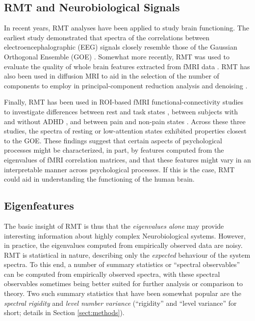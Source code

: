 \documentclass[12pt]{spieman}  %
\begin{document}
\begin{spacing}{2}
\subsection{RMT and Neurobiological Signals}

In recent years, RMT analyses have been applied to study brain functioning. The earliest study
demonstrated that spectra of the correlations between electroencephalographic (EEG) signals closely
resemble those of the Gaussian Orthogonal Ensemble (GOE) \cite{sebaRandomMatrixAnalysis2003}.
Somewhat more recently, RMT was used to evaluate the quality of whole brain features extracted from
fMRI data \cite{voultsidouFeatureEvaluationFMRI2007,verganiRestingStateFMRI2019}. RMT has also
been used in diffusion MRI to aid in the selection of the number of components to employ in
principal-component reduction analysis and denoising
\cite{veraartDenoisingDiffusionMRI2016,verganiRestingStateFMRI2019,ulfarssonDimensionEstimationNoisy2008}.

Finally, RMT has been used in ROI-based fMRI functional-connectivity studies to investigate
differences between rest and task states \cite{wangSpectralPropertiesTemporal2015}, between
subjects with and without ADHD \cite{wangRandomMatrixTheory2016}, and between pain and non-pain
states \cite{matharooSpontaneousBackpainAlters2020}. Across these three studies, the spectra of
resting or low-attention states exhibited properties closest to the GOE. These findings suggest that
certain aspects of psychological processes might be characterized, in part, by features computed
from the eigenvalues of fMRI correlation matrices, and that these features might vary in an
interpretable manner across psychological processes. If this is the case, RMT could aid
in understanding the functioning of the human brain.


\subsection{Eigenfeatures}

The basic insight of RMT is thus that the \textit{eigenvalues alone} may provide interesting
information about highly complex Neurobiological systems. However, in practice, the eigenvalues computed from
empirically observed data are noisy. RMT is statistical in nature, describing only the
\textit{expected} behaviour of the system spectra. To this end, a number of summary statistics or
``spectral observables'' \cite{mehtaRandomMatrices2004} can be computed from empirically observed
spectra, with these spectral observables sometimes being better suited for further analysis or
comparison to theory. Two such summary statistics that have been somewhat popular are the
\textit{spectral rigidity} and \textit{level number variance} (``rigidity'' and ``level variance''
for short; details in Section \ref{sect:methods}).


\end{spacing}
\end{document}
